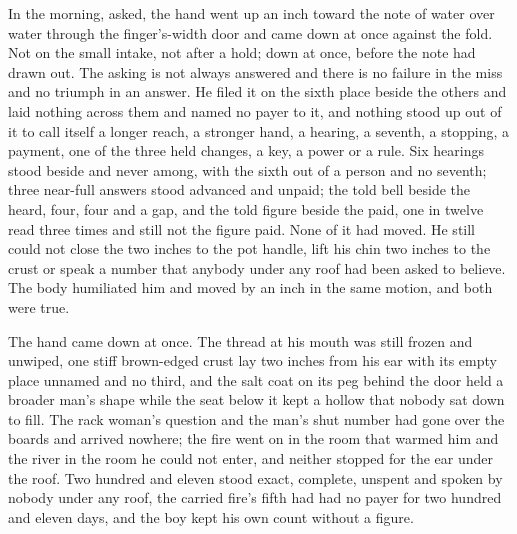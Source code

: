 \scenebreak

In the morning, asked, the hand went up an inch toward the note of water over water through the finger's-width door and came down at once against the fold. Not on the small intake, not after a hold; down at once, before the note had drawn out. The asking is not always answered and there is no failure in the miss and no triumph in an answer. He filed it on the sixth place beside the others and laid nothing across them and named no payer to it, and nothing stood up out of it to call itself a longer reach, a stronger hand, a hearing, a seventh, a stopping, a payment, one of the three held changes, a key, a power or a rule. Six hearings stood beside and never among, with the sixth out of a person and no seventh; three near-full answers stood advanced and unpaid; the told bell beside the heard, four, four and a gap, and the told figure beside the paid, one in twelve read three times and still not the figure paid. None of it had moved. He still could not close the two inches to the pot handle, lift his chin two inches to the crust or speak a number that anybody under any roof had been asked to believe. The body humiliated him and moved by an inch in the same motion, and both were true.

The hand came down at once. The thread at his mouth was still frozen and unwiped, one stiff brown-edged crust lay two inches from his ear with its empty place unnamed and no third, and the salt coat on its peg behind the door held a broader man's shape while the seat below it kept a hollow that nobody sat down to fill. The rack woman's question and the man's shut number had gone over the boards and arrived nowhere; the fire went on in the room that warmed him and the river in the room he could not enter, and neither stopped for the ear under the roof. Two hundred and eleven stood exact, complete, unspent and spoken by nobody under any roof, the carried fire's fifth had had no payer for two hundred and eleven days, and the boy kept his own count without a figure.
